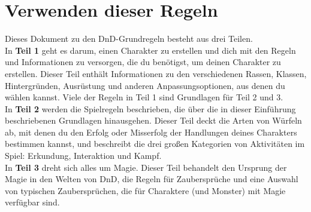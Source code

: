 \section{Verwenden dieser Regeln}
Dieses Dokument zu den DnD-Grundregeln besteht aus drei Teilen.\\
In \textbf{Teil 1} geht es darum, einen Charakter zu erstellen und dich mit den Regeln und Informationen zu versorgen, die du benötigst, um deinen Charakter zu erstellen. Dieser Teil enthält Informationen zu den verschiedenen Rassen, Klassen, Hintergründen, Ausrüstung und anderen Anpassungsoptionen, aus denen du wählen kannst. Viele der Regeln in Teil 1 sind Grundlagen für Teil 2 und 3.\\
In \textbf{Teil 2} werden die Spielregeln beschrieben, die über die in dieser Einführung beschriebenen Grundlagen hinausgehen. Dieser Teil deckt die Arten von Würfeln ab, mit denen du den Erfolg oder Misserfolg der Handlungen deines Charakters bestimmen kannst, und beschreibt die drei großen Kategorien von Aktivitäten im Spiel: Erkundung, Interaktion und Kampf.\\
In \textbf{Teil 3} dreht sich alles um Magie. Dieser Teil behandelt den Ursprung der Magie in den Welten von DnD, die Regeln für Zaubersprüche und eine Auswahl von typischen Zaubersprüchen, die für Charaktere (und Monster) mit Magie verfügbar sind.

